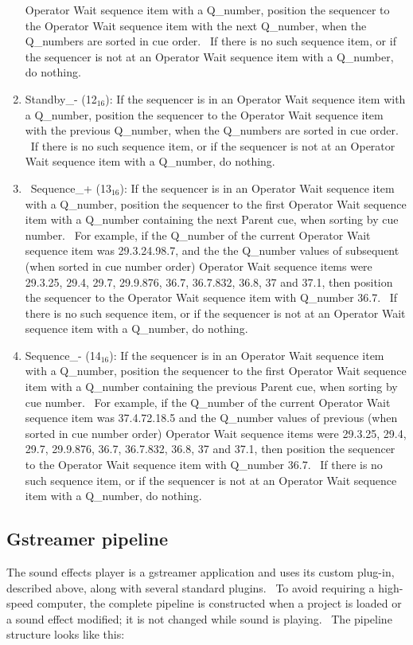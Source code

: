 \documentclass[letterpaper]{article}
\newcommand\textsubscript[1]{\ensuremath{{}_{\text{#1}}}}
\begin{document}
\begin{enumerate}
Operator Wait sequence item with a Q\_number, position the sequencer to
the Operator Wait sequence item with the next Q\_number, when the
Q\_numbers are sorted in cue order. \ If there is no such sequence
item, or if the sequencer is not at an Operator Wait sequence item with
a Q\_number, do nothing.
\item Standby\_- (12\textsubscript{16}): If the sequencer is in an
Operator Wait sequence item with a Q\_number, position the sequencer to
the Operator Wait sequence item with the previous Q\_number, when the
Q\_numbers are sorted in cue order. \ If there is no such sequence
item, or if the sequencer is not at an Operator Wait sequence item with
a Q\_number, do nothing.
\item \ Sequence\_+ (13\textsubscript{16}): If the sequencer is in an
Operator Wait sequence item with a Q\_number, position the sequencer to
the first Operator Wait sequence item with a Q\_number containing the
next Parent cue, when sorting by cue number. \ For example, if the
Q\_number of the current Operator Wait sequence item was 29.3.24.98.7,
and the the Q\_number values of subsequent (when sorted in cue number
order) Operator Wait sequence items were 29.3.25, 29.4, 29.7, 29.9.876,
36.7, 36.7.832, 36.8, 37 and 37.1, then position the sequencer to the
Operator Wait sequence item with Q\_number 36.7. \ If there is no such
sequence item, or if the sequencer is not at an Operator Wait sequence
item with a Q\_number, do nothing.
\item Sequence\_- (14\textsubscript{16}): If the sequencer is in an
Operator Wait sequence item with a Q\_number, position the sequencer to
the first Operator Wait sequence item with a Q\_number containing the
previous Parent cue, when sorting by cue number. \ For example, if the
Q\_number of the current Operator Wait sequence item was 37.4.72.18.5
and the Q\_number values of previous (when sorted in cue number order)
Operator Wait sequence items were 29.3.25, 29.4, 29.7, 29.9.876, 36.7,
36.7.832, 36.8, 37 and 37.1, then position the sequencer to the
Operator Wait sequence item with Q\_number 36.7. \ If there is no such
sequence item, or if the sequencer is not at an Operator Wait sequence
item with a Q\_number, do nothing.
\end{enumerate}
\subsection[Gstreamer pipeline]{Gstreamer pipeline}
The sound effects player is a gstreamer application and uses its custom
plug-in, described above, along with several standard plugins. \ To
avoid requiring a high-speed computer, the complete pipeline is
constructed when a project is loaded or a sound effect modified; it is
not changed while sound is playing. \ The pipeline structure looks like
this:
\end{document}
